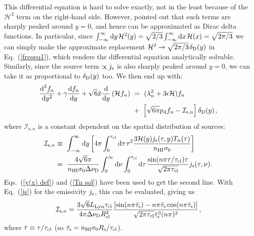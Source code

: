 \documentclass[fleqn,usenatbib]{mnras}
\newcommand{\taucl}{\tau_{\rm cl}}
\begin{document}
This differential equation is hard to solve exactly, not in the least because of the $\mathcal{H}^2$ term on the right-hand side. However, \cite{Harrington1973} pointed out that such terms are sharply peaked around $y = 0$, and hence can be approximated as Dirac delta functions. In particular, since $\int_{-\infty}^{\infty} \textrm{d}y \hspace{1 pt} \mathcal{H}^2(y) = \sqrt{2/3} \int_{-\infty}^{\infty} \textrm{d}x \hspace{1 pt} \mathcal{H}(x) = \sqrt{2\pi/3}$ we can simply make the approximate replacement $\mathcal{H}^2 \rightarrow \sqrt{2 \pi/3} \hspace{1 pt} \delta_{\rm D}(y)$ in Eq.~(\ref{freqeq1}), which renders the differential equation analytically solvable. Similarly, since the source term $\propto j_{\rm s}$ is also sharply peaked around $y = 0$, we can take it as proportional to $\delta_{\rm D}(y)$ too. We then end up with:
\begin{align}
    \dfrac{\textrm{d}^2 f_n}{\textrm{d}y^2} + \gamma \dfrac{\textrm{d} f_n}{\textrm{d}y} + \sqrt{6} \Bar{x} \dfrac{\textrm{d}}{\textrm{d}y} \left( \mathcal{H} f_n \right)  ~&=~ (\lambda_n^2 + 3 \epsilon \mathcal{H} )f_n \nonumber \\~&+~ \left[ \sqrt{6 \pi} p_{\rm d} f_n - \mathcal{I}_{\textrm{s},n} \right] \delta_{\rm D}(y) \hspace{1 pt} , \label{freqeq2}
\end{align}
where $\mathcal{I}_{\textrm{s}, n}$ is a constant dependent on the spatial distribution of sources:
\begin{align}
    \mathcal{I}_{\textrm{s}, n} &\equiv~ \int_{-\infty}^{\infty} \textrm{d}y \left[ 4\pi \int_0^{\tau_{\rm cl}} \textrm{d}\tau \hspace{1 pt} \tau^2  \dfrac{3 \mathcal{H}(y) j_{\rm s}(\tau, y) T_n(\tau)}{ n_{\rm HI} \sigma_0} \right] \nonumber \\
    &=~ \dfrac{4 \sqrt{6} \pi}{n_{\rm HI} \sigma_0 \Delta \nu_{\rm D}} \int_0^{\infty} \textrm{d}\nu \int_0^{\taucl}  \textrm{d}\tau \hspace{1 pt}  \dfrac{\sin(n \pi \tau/\taucl) \tau}{\sqrt{2 \pi \taucl}} j_{\rm s}(\tau,\nu) \hspace{1 pt} .
\end{align}
Eqs.~(\ref{y(x) def}) and (\ref{Tn sol}) have been used to get the second line. With Eq.~(\ref{js}) for the emissivity $j_{\rm s}$, this can be evaluated, giving us
\begin{equation}
    \mathcal{I}_{\textrm{s}, n} = \dfrac{3\sqrt{6} L_{\rm Ly\alpha} \taucl}{4 \pi \Delta \nu_{\rm D} R_{\rm cl}^2} \dfrac{[\sin(n\pi \Bar{\tau}_{\rm s}) - n\pi \Bar{\tau}_{\rm s} \cos( n\pi \Bar{\tau}_{\rm s})]}{ \sqrt{2 \pi \taucl} \Bar{\tau}_{\rm s}^3 (n \pi)^2} \hspace{1 pt} \label{Isn},
\end{equation}
where $\Bar{\tau} \equiv \tau/\taucl$ (so $\Bar{\tau}_{\rm s} = n_{\rm HI} \sigma_0 R_{\rm s}/\taucl$).
\end{document}
